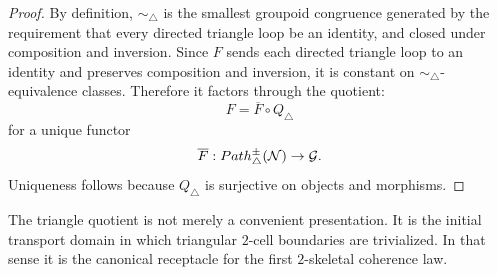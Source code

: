 \begin{proof}
	By definition, \(\sim_\triangle\) is the smallest groupoid congruence
	generated by the requirement that every directed triangle loop be an
	identity, and closed under composition and inversion.  Since \(F\)
	sends each directed triangle loop to an identity and preserves
	composition and inversion, it is constant on
	\(\sim_\triangle\)-equivalence classes.  Therefore it factors through
	the quotient:
	\[
		F=\overline F\circ Q_\triangle
	\]
	for a unique functor
	\[
		\overline F:Path^\pm_\triangle(\mathcal N)\to\mathcal G.
	\]
	Uniqueness follows because \(Q_\triangle\) is surjective on objects and
	morphisms.
\end{proof}
\begin{remark}
	The triangle quotient is not merely a convenient presentation.  It is
	the initial transport domain in which triangular \(2\)-cell boundaries
	are trivialized.  In that sense it is the canonical receptacle for the
	first \(2\)-skeletal coherence law.
\end{remark}
